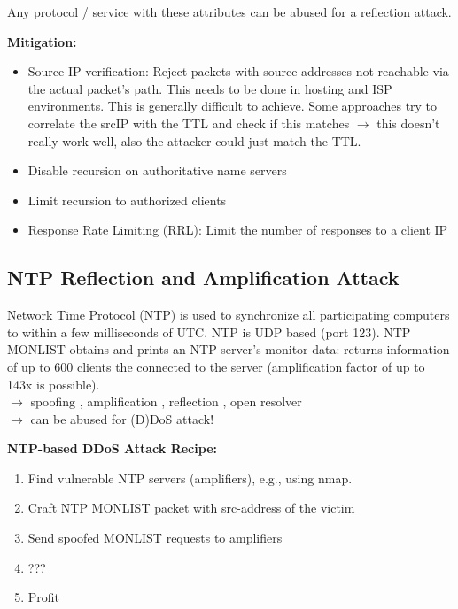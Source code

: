 \documentclass[11pt,oneside,a4paper]{article}
\begin{document}
Any protocol / service with these attributes can be abused for a reflection attack.

\textbf{Mitigation:}

\vspace{-\topsep}
\begin{itemize}
	\setlength{\itemsep}{0pt}
	\setlength{\parskip}{0pt}
	\item Source IP verification: Reject packets with source addresses not reachable via the actual packet’s	path. This needs to be done in hosting and ISP environments. This is generally difficult to achieve. Some approaches try to correlate the srcIP with the TTL and check if this matches $\rightarrow$ this doesn't really work well, also the attacker could just match the TTL.
	\item Disable recursion on authoritative name servers
	\item Limit recursion to authorized clients
	\item Response Rate Limiting (RRL): Limit the number of responses to a client IP
\end{itemize}
\vspace{-\topsep}


\subsection{NTP Reflection and Amplification Attack}

Network Time Protocol (NTP) is used to synchronize all participating computers to within a few milliseconds of UTC. NTP is UDP based (port 123). NTP MONLIST obtains and prints an NTP server's monitor data: returns information of up to 600 clients the connected to the server (amplification factor of up to 143x is possible).\\
$\rightarrow$ spoofing \checkmark, amplification \checkmark, reflection \checkmark, open resolver \checkmark\\
$\rightarrow$ can be abused for (D)DoS attack!

\textbf{NTP-based DDoS Attack Recipe:}

\vspace{-\topsep}
\begin{enumerate}
	\setlength{\itemsep}{0pt}
	\setlength{\parskip}{0pt}
	\item Find vulnerable NTP servers (amplifiers), e.g., using nmap.
	\item Craft NTP MONLIST packet with src-address of the victim
	\item Send spoofed MONLIST requests to amplifiers
	\item ???
	\item Profit
\end{enumerate}
\vspace{-\topsep}
\end{document}
